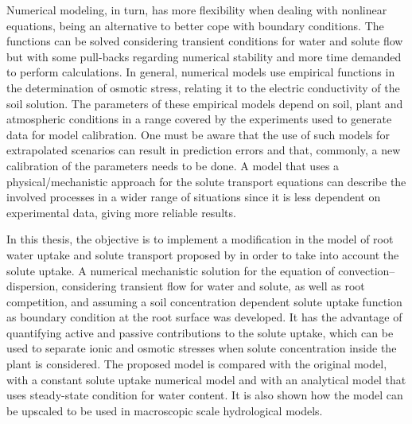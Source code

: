 Numerical modeling, in turn, has more flexibility when dealing with nonlinear equations, being an alternative to better cope with boundary conditions. 
The functions can be solved considering transient conditions for water and solute flow but with some pull-backs regarding numerical stability and more time demanded to perform calculations.
In general, numerical models use empirical functions in the determination of osmotic stress, relating it to the electric conductivity of the soil solution. 
The parameters of these empirical models depend on soil, plant and atmospheric conditions in a range covered by the experiments used to generate data for model calibration. 
One must be aware that the use of such models for extrapolated scenarios can result in prediction errors and that, commonly, a new calibration of the parameters needs to be done.
A model that uses a physical/mechanistic approach for the solute transport equations can describe the involved processes in a wider range of situations since it is less dependent on experimental data, giving more reliable results.


In this thesis, the objective is to 
implement a modification in the model of root water uptake and solute transport proposed by \citeonline[liersolute] in order to take into account the solute uptake.
A numerical mechanistic solution for the equation of convection--dispersion, considering transient flow for water and solute, as well as root competition, and assuming a soil concentration dependent solute uptake function as boundary condition at the root surface was developed.
It has the advantage of quantifying active and passive contributions to the solute uptake, which can be used to separate ionic and osmotic stresses when solute concentration inside the plant is considered. 
The proposed model is compared with 
the original model,
with a constant solute uptake numerical model and with an analytical model that uses steady-state condition for water content. 
It is also shown how the model can be upscaled to be used in macroscopic scale hydrological models.

